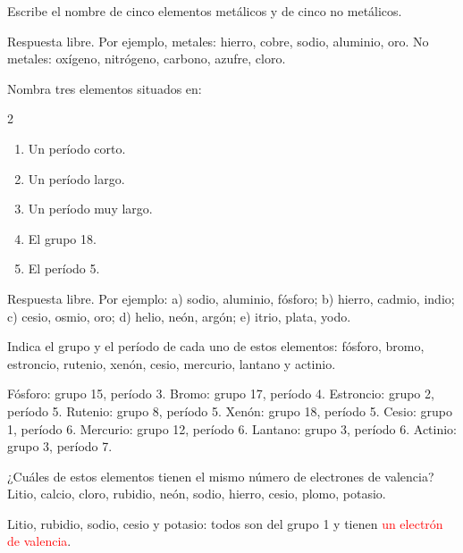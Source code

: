 \begin{exercise}
    Escribe el nombre de cinco elementos metálicos y de cinco no metálicos.
    \begin{solu}
        Respuesta libre. Por ejemplo, metales: hierro, cobre, sodio, aluminio, oro. No metales: oxígeno, nitrógeno, carbono, azufre, cloro.
    \end{solu}
\end{exercise}

\begin{exercise}
    Nombra tres elementos situados en:
    \begin{multicols}{2}
        \begin{enumerate}[label=\alph*)]
            \item Un período corto.
            \item Un período largo.
            \item Un período muy largo.
            \item El grupo 18.
            \item El período 5.
        \end{enumerate}
    \end{multicols}
    \begin{solu}
        Respuesta libre. Por ejemplo: a) sodio, aluminio, fósforo; b) hierro, cadmio, indio; c) cesio, osmio, oro; d) helio, neón, argón; e) itrio, plata, yodo.
    \end{solu}
\end{exercise}

\begin{exercise}
    Indica el grupo y el período de cada uno de estos elementos: fósforo, bromo, estroncio, rutenio, xenón, cesio, mercurio, lantano y actinio.
    \begin{solu}
        Fósforo: grupo 15, período 3. Bromo: grupo 17, período 4. Estroncio: grupo 2, período 5. Rutenio: grupo 8, período 5. Xenón: grupo 18, período 5. Cesio: grupo 1, período 6. Mercurio: grupo 12, período 6. Lantano: grupo 3, período 6. Actinio: grupo 3, período 7.
    \end{solu}
\end{exercise}

\begin{exercise}
    ¿Cuáles de estos elementos tienen el mismo número de electrones de valencia? Litio, calcio, cloro, rubidio, neón, sodio, hierro, cesio, plomo, potasio.
    \begin{solu}
        Litio, rubidio, sodio, cesio y potasio: todos son del grupo 1 y tienen \textcolor{red}{un electrón de valencia}.
    \end{solu}
\end{exercise}

